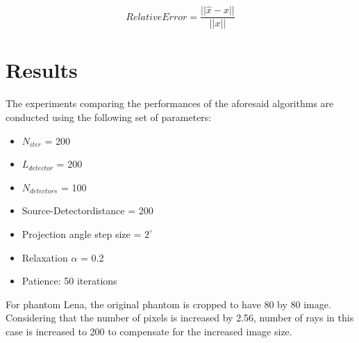 \documentclass[journal]{IEEEtran}
\begin{document}
\begin{equation}
	Relative Error = \frac{||\hat{x} - x||}{||x||} \label{eqn:relativeerror}
\end{equation}

\section{Results}\label{sec:results}

The experiments comparing the performances of the aforesaid algorithms are conducted using the following set of parameters: 

\begin{multicols}{2}
    \begin{itemize}
        \item $N_{iter}$ = 200
        \item $L_{detector}$ = 200
        \item $N_{detectors}$ = 100
        \item Source-Detector\newline distance = 200
        \item Projection angle \newline step size = $2^\circ$
        \item Relaxation $\alpha$ = 0.2
        \item Patience: 50 iterations
    \end{itemize}
    \end{multicols}

For phantom Lena, the original phantom is cropped to have 80 by 80 image. Considering that the number of pixels is increased by 2.56, number of rays in this case is increased to 200 to compensate for the increased image size. 
\end{document}
